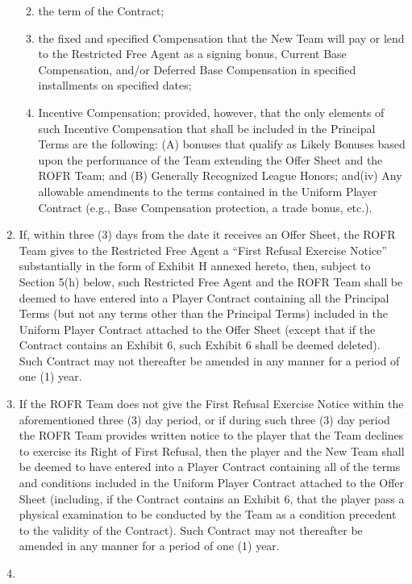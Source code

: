 \documentclass[
]{book}
\providecommand{\tightlist}{%
  \setlength{\itemsep}{0pt}\setlength{\parskip}{0pt}}
\begin{document}
\begin{enumerate}
  \begin{enumerate}
  \def\labelenumii{(\roman{enumii})}
  \tightlist
  \item
    the term of the Contract;
  \item
    the fixed and specified Compensation that the New Team will pay or lend to the Restricted Free Agent as a signing bonus, Current Base Compensation, and/or Deferred Base Compensation in specified installments on specified dates;
  \item
    Incentive Compensation; provided, however, that the only elements of such Incentive Compensation that shall be included in the Principal Terms are the following: (A) bonuses that qualify as Likely Bonuses based upon the performance of the Team extending the Offer Sheet and the ROFR Team; and (B) Generally Recognized League Honors; and(iv) Any allowable amendments to the terms contained in the Uniform Player Contract (e.g., Base Compensation protection, a trade bonus, etc.).
  \end{enumerate}
\item
  If, within three (3) days from the date it receives an Offer Sheet, the ROFR Team gives to the Restricted Free Agent a ``First Refusal Exercise Notice'' substantially in the form of Exhibit H annexed hereto, then, subject to Section 5(h) below, such Restricted Free Agent and the ROFR Team shall be deemed to have entered into a Player Contract containing all the Principal Terms (but not any terms other than the Principal Terms) included in the Uniform Player Contract attached to the Offer Sheet (except that if the Contract contains an Exhibit 6, such Exhibit 6 shall be deemed deleted). Such Contract may not thereafter be amended in any manner for a period of one (1) year.
\item
  If the ROFR Team does not give the First Refusal Exercise Notice within the aforementioned three (3) day period, or if during such three (3) day period the ROFR Team provides written notice to the player that the Team declines to exercise its Right of First Refusal, then the player and the New Team shall be deemed to have entered into a Player Contract containing all of the terms and conditions included in the Uniform Player Contract attached to the Offer Sheet (including, if the Contract contains an Exhibit 6, that the player pass a physical examination to be conducted by the Team as a condition precedent to the validity of the Contract). Such Contract may not thereafter be amended in any manner for a period of one (1) year.
\item

\end{enumerate}
\end{document}

